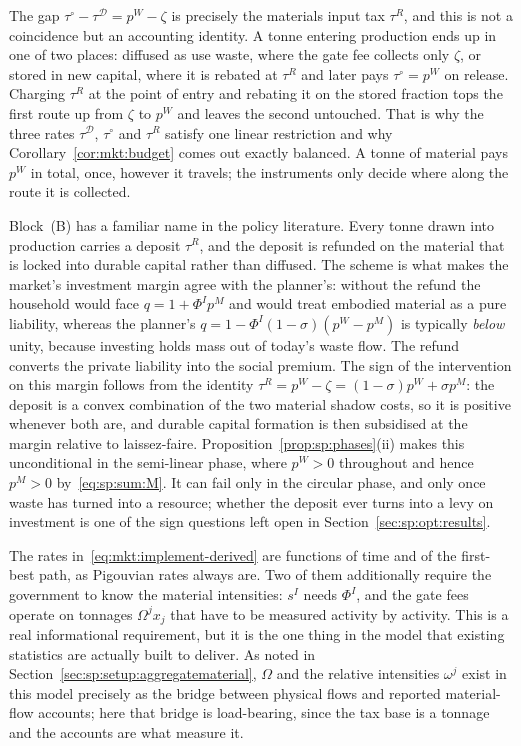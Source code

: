  The gap $\tau^{\circ}-\tau^{\mathcal D}=p^W-\zeta$
is precisely the materials input tax $\tau^R$, and this is not a coincidence but an accounting identity.
A tonne entering production ends up in one of two places: diffused as use waste, where the gate fee
collects only $\zeta$, or stored in new capital, where it is rebated at $\tau^R$ and later pays
$\tau^{\circ}=p^W$ on release. Charging $\tau^R$ at the point of entry and rebating it on the stored
fraction tops the first route up from $\zeta$ to $p^W$ and leaves the second untouched. That is why the
three rates $\tau^{\mathcal D}$, $\tau^{\circ}$ and $\tau^R$ satisfy one linear restriction and why
Corollary~\ref{cor:mkt:budget} comes out exactly balanced. A tonne of material pays $p^W$ in total,
once, however it travels; the instruments only decide where along the route it is collected.

 Block~(B) has a familiar name in the policy literature. Every
tonne drawn into production carries a deposit $\tau^R$, and the deposit is refunded on the material
that is locked into durable capital rather than diffused. The scheme is what makes the market's
investment margin agree with the planner's: without the refund the household would face
$q=1+\Phi^Ip^M$ and would treat embodied material as a pure liability, whereas the planner's
$q=1-\Phi^I\left(1-\sigma\right)\left(p^W-p^M\right)$ is typically \emph{below} unity, because
investing holds mass out of today's waste flow. The refund converts the private liability into the
social premium. The sign of the intervention on this margin follows from the identity
$\tau^R=p^W-\zeta=\left(1-\sigma\right)p^W+\sigma p^M$: the deposit is a convex combination of the two
material shadow costs, so it is positive whenever both are, and durable capital formation is then
subsidised at the margin relative to laissez-faire. Proposition~\ref{prop:sp:phases}(ii) makes this
unconditional in the semi-linear phase, where $p^W>0$ throughout and hence $p^M>0$
by~\eqref{eq:sp:sum:M}. It can fail only in the circular phase, and only once waste has turned into a
resource; whether the deposit ever turns into a levy on investment is one of the sign questions left
open in Section~\ref{sec:sp:opt:results}.

 The rates in~\eqref{eq:mkt:implement-derived} are
functions of time and of the first-best path, as Pigouvian rates always are. Two of them additionally
require the government to know the material intensities: $s^I$ needs $\Phi^I$, and the gate fees
operate on tonnages $\Omega^jx_j$ that have to be measured activity by activity. This is a real
informational requirement, but it is the one thing in the model that existing statistics are actually
built to deliver. As noted in Section~\ref{sec:sp:setup:aggregatematerial}, $\Omega$ and the relative
intensities $\omega^j$ exist in this model precisely as the bridge between physical flows and reported
material-flow accounts; here that bridge is load-bearing, since the tax base is a tonnage and the
accounts are what measure it.

